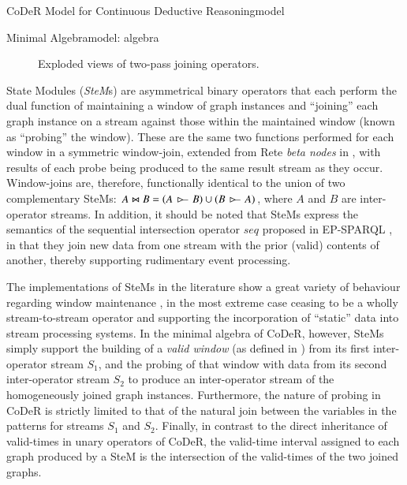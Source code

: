 \begin{nestedsection}{CoDeR Model for Continuous Deductive Reasoning}{model}
\begin{nestedsection}{Minimal Algebra}{model: algebra}
\begin{description}
\begin{figure}[t]
					\caption{Exploded views of two-pass joining operators.}
				\end{figure}
				State Modules (\emph{SteM}s) are asymmetrical binary operators that each perform the dual function of maintaining a window of graph instances and ``joining'' each graph instance on a stream against those within the maintained window (known as ``probing'' the window).
				These are the same two functions performed for each window in a symmetric window-join, extended from Rete \emph{beta nodes} in \citep{ReteDBMS}, with results of each probe being produced to the same result stream as they occur.
				Window-joins are, therefore, functionally identical to the union of two complementary SteMs:
				${A \Join B = \left( A\,\rstreamjoin\,B \right) \cup \left( B\,\rstreamjoin\,A \right)}$, where $A$ and $B$ are inter-operator streams.
				In addition, it should be noted that SteMs express the semantics of the sequential intersection operator ${seq}$ proposed in EP-SPARQL \citep{EP-SPARQL}, in that they join new data from one stream with the prior (valid) contents of another, thereby supporting rudimentary event processing.

				The implementations of SteMs in the literature show a great variety of behaviour regarding window maintenance \citep{SteMs}, in the most extreme case ceasing to be a wholly stream-to-stream operator and supporting the incorporation of ``static'' data into stream processing systems.
				In the minimal algebra of CoDeR, however, SteMs simply support the building of a \emph{valid window} (as defined in ) from its first inter-operator stream $S_1$, and the probing of that window with data from its second inter-operator stream $S_2$ to produce an inter-operator stream of the homogeneously joined graph instances.
				Furthermore, the nature of probing in CoDeR is strictly limited to that of the natural join between the variables in the patterns for streams $S_1$ and $S_2$.
				Finally, in contrast to the direct inheritance of valid-times in unary operators of CoDeR, the valid-time interval assigned to each graph produced by a SteM is the intersection of the valid-times of the two joined graphs.
		\end{description}


\end{nestedsection}
\end{nestedsection}
